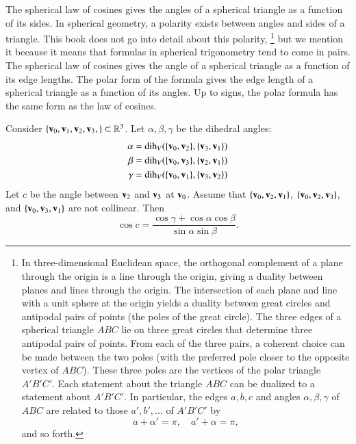 The spherical law of cosines gives the angles of a spherical triangle
as a function of its sides.  In spherical geometry, a
polarity exists between angles and sides of a triangle.  This book does not
go into detail about this polarity,%
%
\footnote{In three-dimensional Euclidean space, the orthogonal
  complement of a plane through the origin is a line through the
  origin, giving a duality between planes and lines through the
  origin.  The intersection of each plane and line with a unit sphere
  at the origin yields a duality between great circles and antipodal
  pairs of points (the poles of the great circle).  The three edges of
  a spherical triangle $ABC$ lie on three great circles that
  determine three antipodal pairs of points.  From each of the three
  pairs, a coherent choice can be made between the two poles (with the preferred pole closer to the opposite vertex of $ABC$).  These
  three poles are the vertices of the polar triangle $A'B'C'$.  Each
  statement about the triangle $ABC$ can be dualized to a statement
  about $A'B'C'$.  In particular, the edges $a,b,c$ and angles
  $\alpha,\beta,\gamma$ of $ABC$ are related to those $a',b',\ldots$
  of $A'B'C'$ by
\[ 
a + \alpha' = \pi,\quad a' + \alpha= \pi,
\] 
and so forth.
}  %
%
%
 but we mention it because it means that formulas in spherical
trigonometry tend to come in pairs.  The spherical law of cosines
gives the angle of a spherical triangle as a function of its edge
lengths.  The polar form of the formula gives the
edge length of a spherical triangle as a function of its angles.
Up to signs,
the polar formula has the same form as the law of cosines.
%

\begin{lemma}
\label{lemma:sloc2}  Consider 
  $\{{\mathbf v}_0,{\mathbf v}_1,{\mathbf v}_2,{\mathbf v}_3,\}\subset\mathbb{R}^3$.  Let
  $\alpha,\beta,\gamma$ be the dihedral angles:
\begin{align*}
\alpha &= \operatorname{dih}_V(\{{\mathbf v}_0,{\mathbf v}_2\},\{{\mathbf v}_3,{\mathbf v}_1\})\\
\beta &= \operatorname{dih}_V(\{{\mathbf v}_0,{\mathbf v}_3\},\{{\mathbf v}_2,{\mathbf v}_1\})\\
\gamma&= \operatorname{dih}_V(\{{\mathbf v}_0,{\mathbf v}_1\},\{{\mathbf v}_3,{\mathbf v}_2\})\\
\end{align*}
Let $c$ be the
angle between ${\mathbf v}_2$ and ${\mathbf v}_3$ at ${\mathbf v}_0$. 
Assume that $\{{\mathbf v}_0,{\mathbf v}_2,{\mathbf v}_1\}$, $\{{\mathbf v}_0,{\mathbf v}_2,{\mathbf v}_3\}$, and $\{{\mathbf v}_0,{\mathbf v}_3,{\mathbf v}_1\}$ are not collinear.
Then
\[ 
\cos c = \frac{\cos \gamma + \cos \alpha \cos \beta}
{\sin \alpha\sin \beta}.
\] 
\end{lemma}
%
%

